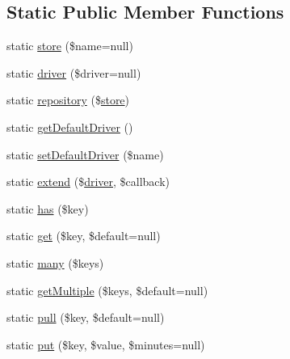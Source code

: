 \subsection*{Static Public Member Functions}
\begin{DoxyCompactItemize}
\item 
static \mbox{\hyperlink{class_illuminate_1_1_support_1_1_facades_1_1_cache_a38e0420a18737d8cb49a6338174e58c5}{store}} (\$name=null)
\item 
static \mbox{\hyperlink{class_illuminate_1_1_support_1_1_facades_1_1_cache_afb69f3cc434ae38820079598349e543c}{driver}} (\$driver=null)
\item 
static \mbox{\hyperlink{class_illuminate_1_1_support_1_1_facades_1_1_cache_a85e3c1206e480386f4944aea0040b681}{repository}} (\$\mbox{\hyperlink{class_illuminate_1_1_support_1_1_facades_1_1_cache_a38e0420a18737d8cb49a6338174e58c5}{store}})
\item 
static \mbox{\hyperlink{class_illuminate_1_1_support_1_1_facades_1_1_cache_aefecc75567ab9855d949ddb8eaa434b5}{get\+Default\+Driver}} ()
\item 
static \mbox{\hyperlink{class_illuminate_1_1_support_1_1_facades_1_1_cache_a06a08b9ba638eb410c7e209092fa21bc}{set\+Default\+Driver}} (\$name)
\item 
static \mbox{\hyperlink{class_illuminate_1_1_support_1_1_facades_1_1_cache_a7ed3e4ef136849940ce40de0094563ef}{extend}} (\$\mbox{\hyperlink{class_illuminate_1_1_support_1_1_facades_1_1_cache_afb69f3cc434ae38820079598349e543c}{driver}}, \$callback)
\item 
static \mbox{\hyperlink{class_illuminate_1_1_support_1_1_facades_1_1_cache_af87ff499ffa620f8bf4a7e93571009e8}{has}} (\$key)
\item 
static \mbox{\hyperlink{class_illuminate_1_1_support_1_1_facades_1_1_cache_a470e91259e64ae2ba44cef45bece6234}{get}} (\$key, \$default=null)
\item 
static \mbox{\hyperlink{class_illuminate_1_1_support_1_1_facades_1_1_cache_ad164c41f53a86d42e3049cefc49cacb9}{many}} (\$keys)
\item 
static \mbox{\hyperlink{class_illuminate_1_1_support_1_1_facades_1_1_cache_a6ad46fca73497fd215a74a7edea74102}{get\+Multiple}} (\$keys, \$default=null)
\item 
static \mbox{\hyperlink{class_illuminate_1_1_support_1_1_facades_1_1_cache_a5d755e8df5b565d68fa8fbd88aa25a1a}{pull}} (\$key, \$default=null)
\item 
static \mbox{\hyperlink{class_illuminate_1_1_support_1_1_facades_1_1_cache_adda0a194865ce491f1beb2c92b3ab562}{put}} (\$key, \$value, \$minutes=null)

\end{DoxyCompactItemize}
